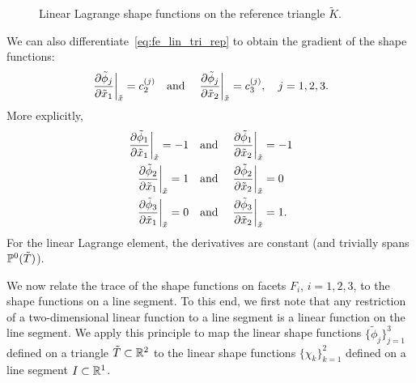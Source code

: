 \begin{figure}
  \centering
  \caption{Linear Lagrange shape functions on the reference triangle $\tilde K$.}
  \label{fig:fe_shape_tri_p1}
\end{figure}
We can also differentiate~\eqref{eq:fe_lin_tri_rep} to obtain the gradient of the shape functions:
\begin{equation*}
  \left. \frac{\partial \tilde \phi_j}{\partial \tilde x_1} \right|_{\tilde x} = c_2^{(j)} \quad \text{and} \quad  \left. \frac{\partial \tilde \phi_j}{\partial \tilde x_2} \right|_{\tilde x} = c_3^{(j)}, \quad j = 1,2,3.
\end{equation*}
More explicitly,
\begin{align*}
  \left. \frac{\partial \tilde \phi_1}{\partial \tilde x_1} \right|_{\tilde x} = -1
  \quad &\text{and} \quad
  \left. \frac{\partial \tilde \phi_1}{\partial \tilde x_2} \right|_{\tilde x} = -1\\
  \left. \frac{\partial \tilde \phi_2}{\partial \tilde x_1} \right|_{\tilde x} = 1
  \quad &\text{and} \quad
  \left. \frac{\partial \tilde \phi_2}{\partial \tilde x_2} \right|_{\tilde x} = 0\\
  \left. \frac{\partial \tilde \phi_3}{\partial \tilde x_1} \right|_{\tilde x} = 0
  \quad &\text{and} \quad
  \left. \frac{\partial \tilde \phi_3}{\partial \tilde x_2} \right|_{\tilde x} = 1.
\end{align*}
For the linear Lagrange element, the derivatives are constant (and trivially spans $\mathbb{P}^0(\tilde T)$). 

We now relate the trace of the shape functions on facets $F_i$, $i = 1,2,3$, to the shape functions on a line segment. To this end, we first note that any restriction of a two-dimensional linear function to a line segment is a linear function on the line segment.  We apply this principle to map the linear shape functions $\{\tilde \phi_j\}_{j=1}^3$ defined on a triangle $\tilde T \subset \mathbb{R}^2$ to the linear shape functions $\{ \chi_k \}_{k=1}^2$ defined on a line segment $I \subset \mathbb{R}^1$.

